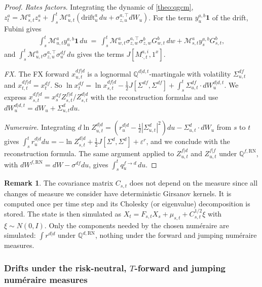 \documentclass[11pt,english]{amsart}
\newcommand{\vun}{\mathbf{1}}
\newcommand{\RN}{\mathrm{RN}}
\newcommand{\QQ}{\mathbb{Q}}
\theoremstyle{definition}
\newtheorem{rema}{Remark}
\begin{document}
\begin{proof}
\emph{Rates factors.} Integrating the dynamic of \autoref{theo:qgcm}, $z^a_t = \mathcal{M}^a_{s,t}z^a_s + \int_s^t\mathcal{M}^a_{u,t}(\textrm{drift}^a_u\,du + \sigma^{a,\top}_{z,u}dW_u)$. For the term $y^{a,b}_u\vun$ of the drift, Fubini gives
\begin{eqnarray*}
  \int_s^t \mathcal{M}^a_{u,t}y^{a,b}_u\vun\,du ~=~ \int_s^t \mathcal{M}^a_{w,t}\sigma^{a,\top}_{z,w}\sigma^b_{z,w}G^b_{w,t}\,dw + \mathcal{M}^a_{s,t}y^{a,b}_s G^b_{s,t} ,
\end{eqnarray*}
and $\int_s^t\mathcal{M}^a_{u,t}\sigma^{a,\top}_{z,u}\sigma^{df}_u\,du$ gives the terms $J[M^{a,i}_{\cdot,t},1^x]$.

\emph{FX.} The FX forward $x^{df|d}_{u,t}$ is a lognormal $\QQ^{d|d,t}$-martingale with volatility $\Sigma^{df}_{u,t}$ and $x^{df|d}_{t,t} = x^{df}_t$. So $\ln x^{df}_t = \ln x^{df|d}_{s,t} - \frac{1}{2}J[\Sigma^{df},\Sigma^{df}] + \int_s^t \Sigma^{df}_{u,t}\cdot dW^{d|d,t}_u$. We express $x^{df|d}_{s,t} = x^{df}_sZ^{f|d}_{s,t}/Z^{d|d}_{s,t}$ with the reconstruction formulas and use $dW^{d|d,t}_u = dW_u + \Sigma^d_{u,t}du$.

\emph{Numeraire.} Integrating $d\ln Z^{d|d}_{u,t} = (r^{d|d}_u - \frac{1}{2}|\Sigma^d_{u,t}|^2)du - \Sigma^d_{u,t}\cdot dW_u$ from $s$ to $t$ gives $\int_s^tr^{d|d}_u du = -\ln Z^{d|d}_{s,t} + \frac{1}{2}J[\Sigma^d,\Sigma^d] + \varepsilon^r$, and we conclude with the reconstruction formula. The same argument applied to $Z^{f|d}_{u,t}$ and $Z^{f|f}_{u,t}$ under $\QQ^{f,\RN}$, with $dW^{f,\RN} = dW - \sigma^{df}du$, gives $\int_s^t q^{f\to d}_u\,du$.
\end{proof}

\begin{rema}
The covariance matrix $C_{s,t}$ does not depend on the measure since all changes of measure we consider have deterministic Girsanov kernels. It is computed once per time step and its Cholesky (or eigenvalue) decomposition is stored. The state is then simulated as $X_t = F_{s,t}X_s + \mu_{s,t} + C_{s,t}^{1/2}\xi$ with $\xi\sim N(0,I)$. Only the components needed by the chosen num\'eraire are simulated: $\int r^{d|d}$ under $\QQ^{d,\RN}$, nothing under the forward and jumping num\'eraire measures.
\end{rema}

\subsubsection{Drifts under the risk-neutral, $T$-forward and jumping num\'eraire measures}
\end{document}
